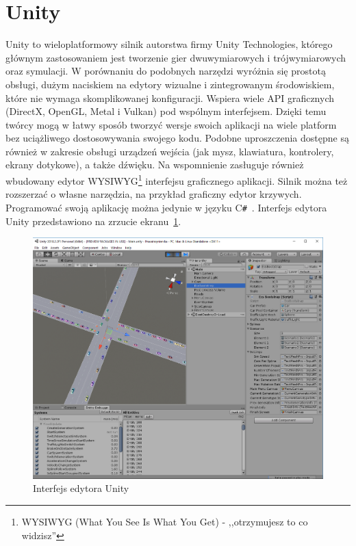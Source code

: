\section*{Unity}
Unity to wieloplatformowy silnik autorstwa firmy Unity Technologies, którego głównym zastosowaniem jest tworzenie gier dwuwymiarowych i trójwymiarowych oraz symulacji. W porównaniu do podobnych narzędzi wyróżnia się prostotą obsługi, dużym naciskiem na edytory wizualne i zintegrowanym środowiskiem, które nie wymaga skomplikowanej konfiguracji. Wspiera wiele API graficznych (DirectX, OpenGL, Metal i Vulkan)\cite{UnityManualGraphicsApiSupport} pod wspólnym interfejsem. Dzięki temu twórcy mogą w łatwy sposób tworzyć wersje swoich aplikacji na wiele platform bez uciążliwego dostosowywania swojego kodu. Podobne uproszczenia dostępne są również w zakresie obsługi urządzeń wejścia (jak mysz, klawiatura, kontrolery, ekrany dotykowe), a także dźwięku. Na wspomnienie zasługuje również wbudowany edytor WYSIWYG\footnote{WYSIWYG (What You See Is What You Get) - ,,otrzymujesz to co widzisz''} interfejsu graficznego aplikacji. Silnik można też rozszerzać o własne narzędzia, na przykład graficzny edytor krzywych. Programować swoją aplikację można jedynie w języku C\texttt{\#}~\cite{ProgramminginUnity}. Interfejs edytora Unity przedstawiono na zrzucie ekranu~\ref{fig:unity}.
\begin{figure}[h]
	\centering
	\includegraphics[width=1\linewidth]{unity}
	\caption[Interfejs edytora Unity]{Interfejs edytora Unity}
	\label{fig:unity}
\end{figure}
